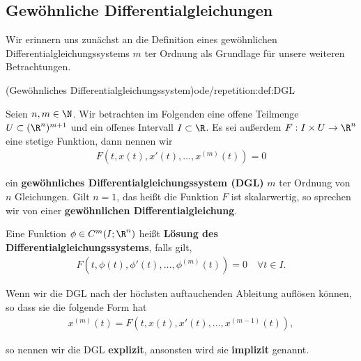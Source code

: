 \documentclass[letterpaper,10pt,english]{jupyterBook}
\begin{document}
\subsection{Gewöhnliche Differentialgleichungen}
\label{\detokenize{ode/repetition:gewohnliche-differentialgleichungen}}
\par
Wir erinnern uns zunächst an die Definition eines gewöhnlichen Differentialgleichungssystems \(m\) ter Ordnung als Grundlage für unsere weiteren Betrachtungen.
\begin{definition}{(Gewöhnliches Differentialgleichungssystem)}{ode/repetition:def:DGL}



\par
Seien \(n,m \in \N\).
Wir betrachten im Folgenden eine offene Teilmenge \(U\subset (\R^n)^{m+1}\) und ein offenes Intervall \(I\subset\R\).
Es sei außerdem \(F:I\times U\rightarrow\R^n\) eine stetige Funktion, dann nennen wir
\begin{align}\label{equation:ode/repetition:eq:DGL}
F(t,x(t),x'(t),\ldots,x^{(m)}(t)) = 0
\end{align}
\par
ein \textbf{gewöhnliches Differentialgleichungssystem (DGL)} \(m\) ter Ordnung von \(n\) Gleichungen.
Gilt \(n=1\), das heißt die Funktion \(F\) ist skalarwertig, so sprechen wir von einer \textbf{gewöhnlichen Differentialgleichung}.

\par
Eine Funktion \(\phi\in C^m(I;\R^n)\) heißt \textbf{Lösung des Differentialgleichungssystems}, falls gilt,
\begin{align*}
F(t, \phi(t), \phi'(t), \ldots, \phi^{(m)}(t)) = 0 \quad \forall t\in I.
\end{align*}
\par
Wenn wir die DGL nach der höchsten auftauchenden Ableitung auflösen können, so dass sie die folgende Form hat
\begin{align*}
x^{(m)}(t) = F(t,x(t),x'(t),\ldots,x^{(m-1)}(t)),
\end{align*}
\par
so nennen wir die DGL \textbf{explizit}, ansonsten wird sie \textbf{implizit} genannt.
\end{definition}
\end{document}
